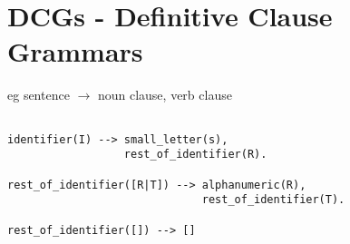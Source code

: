 \documentclass[a4paper,12pt]{article}
\begin{document}
\section*{DCGs - Definitive Clause Grammars}

eg sentence $\to$ noun clause, verb clause

\begin{verbatim}

identifier(I) --> small_letter(s),
                  rest_of_identifier(R).

rest_of_identifier([R|T]) --> alphanumeric(R),
                              rest_of_identifier(T).

rest_of_identifier([]) --> []

\end{verbatim}
\end{document}
